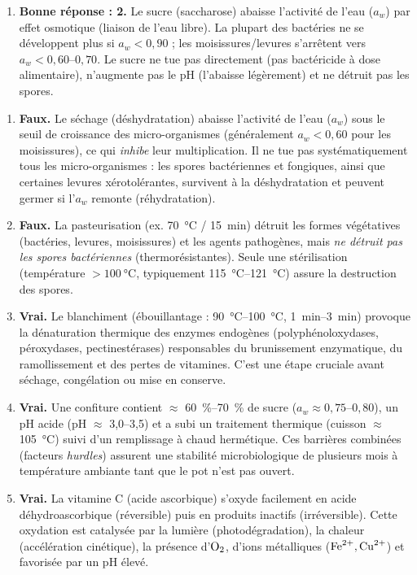 \documentclass[11pt]{article}
\newcommand{\cle}[1]{{\popxbold\color{popdark}#1}}
\begin{document}
\begin{corrige}
\begin{enumerate}
\item \textbf{Bonne réponse : 2.}
Le sucre (saccharose) abaisse l'activité de l'eau ($a_w$) par effet osmotique (liaison de l'eau libre). La plupart des bactéries ne se développent plus si $a_w < 0,90$ ; les moisissures/levures s'arrêtent vers $a_w < 0,60\text{--}0,70$. Le sucre ne tue pas directement (pas bactéricide à dose alimentaire), n'augmente pas le pH (l'abaisse légèrement) et ne détruit pas les spores.
\end{enumerate}
\end{corrige}

\begin{corrige}
\begin{enumerate}
\item \textbf{Faux.} Le \cle{séchage} (déshydratation) abaisse l'activité de l'eau ($a_w$) sous le seuil de croissance des micro-organismes (généralement $a_w < 0,60$ pour les moisissures), ce qui \emph{inhibe} leur multiplication. Il ne tue pas systématiquement tous les micro-organismes : les spores bactériennes et fongiques, ainsi que certaines levures xérotolérantes, survivent à la déshydratation et peuvent germer si l'$a_w$ remonte (réhydratation).
\item \textbf{Faux.} La \cle{pasteurisation} (ex. \SI{70}{\degreeCelsius} / \SI{15}{\minute}) détruit les formes végétatives (bactéries, levures, moisissures) et les agents pathogènes, mais \emph{ne détruit pas les spores bactériennes} (thermorésistantes). Seule une stérilisation (température $> \SI{100}{\degreeCelsius}$, typiquement \SI{115}{\degreeCelsius}--\SI{121}{\degreeCelsius}) assure la destruction des spores.
\item \textbf{Vrai.} Le \cle{blanchiment} (ébouillantage : \SI{90}{\degreeCelsius}--\SI{100}{\degreeCelsius}, \SI{1}{\minute}--\SI{3}{\minute}) provoque la dénaturation thermique des enzymes endogènes (polyphénoloxydases, péroxydases, pectinestérases) responsables du brunissement enzymatique, du ramollissement et des pertes de vitamines. C'est une étape cruciale avant séchage, congélation ou mise en conserve.
\item \textbf{Vrai.} Une \cle{confiture} contient $\approx$ \SI{60}{\%}--\SI{70}{\%} de sucre ($a_w \approx 0,75\text{--}0,80$), un pH acide (pH $\approx$ 3,0--3,5) et a subi un traitement thermique (cuisson $\approx$ \SI{105}{\degreeCelsius}) suivi d'un remplissage à chaud hermétique. Ces barrières combinées (facteurs \emph{hurdles}) assurent une stabilité microbiologique de plusieurs mois à température ambiante tant que le pot n'est pas ouvert.
\item \textbf{Vrai.} La \cle{vitamine C} (acide ascorbique) s'oxyde facilement en acide déhydroascorbique (réversible) puis en produits inactifs (irréversible). Cette oxydation est catalysée par la lumière (photodégradation), la chaleur (accélération cinétique), la présence d'$\ce{O2}$, d'ions métalliques ($\ce{Fe^{2+}}, \ce{Cu^{2+}}$) et favorisée par un pH élevé.
\end{enumerate}
\end{corrige}
\end{document}
